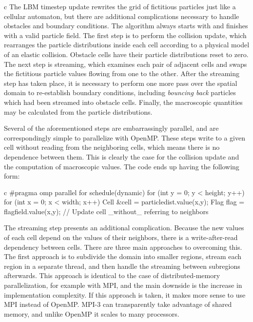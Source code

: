 \documentclass[conference, a4paper]{IEEEtran-modified}
\begin{document}
\begin{ccode}[]{c}
The LBM timestep update rewrites the grid of fictitious particles just like a cellular automaton, but there are additional complications necessary to handle obstacles and boundary conditions. The algorithm always starts with and finishes with a valid particle field. The first step is to perform the collision update, which rearranges the particle distributions inside each cell according to a physical model of an elastic collision. Obstacle cells have their particle distributions reset to zero. The next step is streaming, which examines each pair of adjacent cells and swaps the fictitious particle values flowing from one to the other. After the streaming step has taken place, it is necessary to perform one more pass over the spatial domain to re-establish boundary conditions, including \emph{bouncing back} particles which had been streamed into obstacle cells. Finally, the macroscopic quantities may be calculated from the particle distributions.

Several of the aforementioned steps are embarrassingly parallel, and are correspondingly simple to parallelize with OpenMP. These steps write to a given cell without reading from the neighboring cells, which means there is no dependence between them. This is clearly the case for the collision update and the computation of macroscopic values. The code ends up having the following form:

\begin{ccode}[]
{c}
        #pragma omp parallel for schedule(dynamic)
        for (int y = 0; y < height; y++) {
          for (int x = 0; x < width; x++) {
            Cell &cell = particledist.value(x,y);
            Flag flag = flagfield.value(x,y);
            // Update cell _without_ referring to neighbors
          }
        }
\end{ccode}

The streaming step presents an additional complication. Because the new values of each cell depend on the values of their neighbors, there is a write-after-read dependency between cells. There are three main approaches to overcoming this. The first approach is to subdivide the domain into smaller regions, stream each region in a separate thread, and then handle the streaming between subregions afterwards. This approach is identical to the case of distributed-memory parallelization, for example with MPI, and the main downside is the increase in implementation complexity. If this approach is taken, it makes more sense to use MPI instead of OpenMP. MPI-3 can transparently take advantage of shared memory, and unlike OpenMP it scales to many processors.


\end{ccode}
\end{document}
